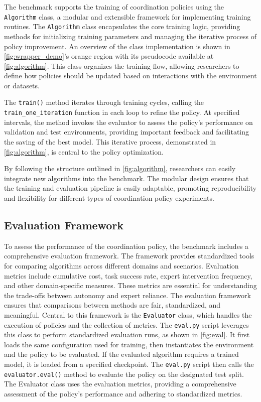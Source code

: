 The \ourMethod benchmark supports the training of coordination policies using the \texttt{Algorithm} class, a modular and extensible framework for implementing training routines. The \texttt{Algorithm} class encapsulates the core training logic, providing methods for initializing training parameters and managing the iterative process of policy improvement. An overview of the class implementation is shown in \autoref{fig:wrapper_demo}'s \colorbox{sbOrange025}{orange region} with its pseudocode available at \autoref{fig:algorithm}. This class organizes the training flow, allowing researchers to define how policies should be updated based on interactions with the environment or datasets.

The \texttt{train()} method iterates through training cycles, calling the \texttt{train\_one\_iteration} function in each loop to refine the policy. At specified intervals, the method invokes the evaluator to assess the policy’s performance on validation and test environments, providing important feedback and facilitating the saving of the best model. This iterative process, demonstrated in \autoref{fig:algorithm}, is central to the policy optimization.

By following the structure outlined in \autoref{fig:algorithm}, researchers can easily integrate new algorithms into the benchmark. The modular design ensures that the training and evaluation pipeline is easily adaptable, promoting reproducibility and flexibility for different types of coordination policy experiments.

\subsection{Evaluation Framework}



To assess the performance of the coordination policy, the benchmark includes a comprehensive evaluation framework. The framework provides standardized tools for comparing algorithms across different domains and scenarios. Evaluation metrics include cumulative cost, task success rate, expert intervention frequency, and other domain-specific measures. These metrics are essential for understanding the trade-offs between autonomy and expert reliance. The evaluation framework ensures that comparisons between methods are fair, standardized, and meaningful. Central to this framework is the \texttt{Evaluator} class, which handles the execution of policies and the collection of metrics. The \texttt{eval.py} script leverages this class to perform standardized evaluation runs, as shown in \autoref{fig:eval}. It first loads the same configuration used for training, then instantiates the environment and the policy to be evaluated. If the evaluated algorithm requires a trained model, it is loaded from a specified checkpoint. The \texttt{eval.py} script then calls the \texttt{evaluator.eval()} method to evaluate the policy on the designated test split. The Evaluator class uses the evaluation metrics, providing a comprehensive assessment of the policy's performance and adhering to standardized metrics.



